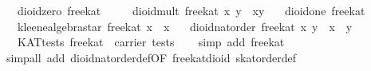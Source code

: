 \begin{isabellebody}
\ \ \ {}dioid{}zero\ free{}kat\ {}\ {}{}\isanewline
\ \ \ {}dioid{}mult\ free{}kat\ x\ y\ {}\ x{}y{}\isanewline
\ \ \ {}dioid{}one\ free{}kat\ {}\ {}{}\isanewline
\ \ \ {}kleene{}algebra{}star\ free{}kat\ x\ {}\ x\isanewline
\ \ \ {}dioid{}nat{}order\ free{}kat\ x\ y\ {}\ {}x\ {}\ y{}{}\isanewline
\ \ \ {}KAT{}tests\ free{}kat\ {}\ carrier\ tests{}\isanewline
%
\isadelimproof
\ \ %
\endisadelimproof
%
\isatagproof
{}\isamarkupfalse%
\ {}simp\ add{}\ free{}kat{}\isanewline
\ \ \isamarkupfalse%
\ {}simp{}all\ add{}\ dioid{}nat{}order{}def{}OF\ free{}kat{}dioid{}\ skat{}order{}def{}\isanewline

\end{isabellebody}
